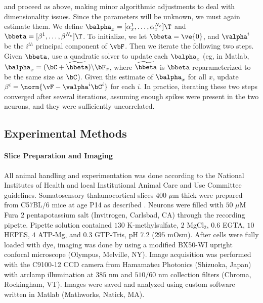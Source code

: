 \noindent and proceed as above, making minor algorithmic adjustments to deal with dimensionality issues.  Since the parameters will be unknown, we must again estimate them. We define $\balpha_x=[\alpha_x^1, \ldots, \alpha_x^{N_c}]\T$ and $\bbeta=[\beta^1, \ldots, \beta^{N_c}]\T$.  To initialize, we let $\bbeta=\ve{0}$, and $\valpha^i$ be the $i^{th}$ principal component of $\vbF$.  Then we iterate the following two steps.  Given $\bbeta$, use a quadratic solver to update each $\balpha_x$ (eg, in Matlab, $\balpha_x = (\bC + \widetilde{\bbeta})\backslash \bF_x$, where $\widetilde{\bbeta}$ is $\bbeta$ reparameterized to be the same size as $\bC$).  Given this estimate of $\balpha_x$ for all $x$, update $\beta^i=\norm{\vF - \valpha^i \bC^i}$ for each $i$.  In practice, iterating these two steps converged after several iterations, assuming enough spikes were present in the two neurons, and they were sufficiently uncorrelated.








\subsection{Experimental Methods} \label{sec:exp}

\paragraph{Slice Preparation and Imaging}

All animal handling and experimentation was done according to the National Institutes of Health and local Institutional Animal Care and Use Committee guidelines. Somatosensory thalamocortical slices $400$ $\mu$m thick were prepared from C57BL/6 mice at age P14 as described \cite{MacLeanYuste05}. Neurons were filled with $50$ $\mu$M Fura $2$ pentapotassium salt (Invitrogen, Carlsbad, CA) through the recording pipette. Pipette solution contained $130$ K-methylsulfate, $2$ MgCl$_2$, $0.6$ EGTA, $10$ HEPES, $4$ ATP-Mg, and $0.3$ GTP-Tris, pH $7.2$ ($295$ mOsm).  After cells were fully loaded with dye, imaging was done by using a modified BX50-WI upright confocal microscope (Olympus, Melville, NY).  Image acquisition was performed with the C9100-12 CCD camera from Hamamatsu Photonics (Shizuoka, Japan) with arclamp illumination at $385$ nm and $510/60$ nm collection filters (Chroma, Rockingham, VT).  Images were saved and analyzed using custom software written in Matlab (Mathworks, Natick, MA).

